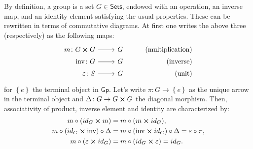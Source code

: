 \documentclass[../Main]{subfiles}
\begin{document}
\begin{rem}[]
	By definition, a group is a set $G \in \mathsf{Sets}$, endowed with an operation,
	an inverse map, and an identity element satisfying the usual properties.
	These can be rewritten in terms of commutative diagrams.
	At first one writes the above three (respectively) as the following maps:
	\begin{equation}
			\begin{tikzcd}[row sep = 0ex
         ,/tikz/column 1/.append style={anchor=base east}
         ,/tikz/column 2/.append style={anchor=base west}
         ,/tikz/column 3/.append style={anchor=base east}]
			m\colon G \cross G \arrow[r, "", rightarrow] &
			G & \text{(multiplication)} \\
			\mathrm{inv}\colon G \arrow[r, "", rightarrow] &
			G & \text{(inverse)} \\
			\varepsilon \colon S \arrow[r, "", rightarrow] &
			G & \text{(unit)} 
		\end{tikzcd}
	\end{equation} 
	for $\left\{ e \right\}$ the terminal object in $\mathsf{Gp}$.
	Let's write $\pi\colon G \to \left\{ e \right\}$
	as the unique arrow in the terminal object
	and $\Delta\colon G \to G \cross G$ the diagonal morphism.
	Then, associativity of product, inverse element and
	identity are characterized by: 
	\begin{align}\label{eq:GroupAxioms}
		m \circ (id_G \cross m) &= m \circ (m \cross id_G),\\
		m \circ (id_G \cross \mathrm{inv}) \circ \Delta &=
		m \circ (\mathrm{inv} \cross id_G) \circ \Delta = \varepsilon \circ \pi,\\
		m \circ (\varepsilon \cross id_G) &=
		m \circ (id_G \cross \varepsilon) = id_G
	.\end{align} 
\end{rem}
\end{document}
